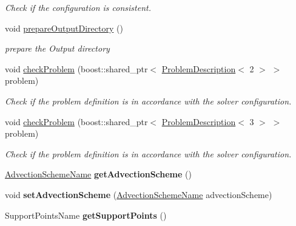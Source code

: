 \begin{DoxyCompactItemize}
\begin{DoxyCompactList}\small\item\em Check if the configuration is consistent. \item\end{DoxyCompactList}\item 
void \hyperlink{classnatrium_1_1SolverConfiguration_a69c009fd87690677b66ab10a000d07f6}{prepareOutputDirectory} ()
\begin{DoxyCompactList}\small\item\em prepare the Output directory \item\end{DoxyCompactList}\item 
void \hyperlink{classnatrium_1_1SolverConfiguration_acc8235baf17f3178be1baf6bd82b35a6}{checkProblem} (boost::shared\_\-ptr$<$ \hyperlink{classnatrium_1_1ProblemDescription}{ProblemDescription}$<$ 2 $>$ $>$ problem)
\begin{DoxyCompactList}\small\item\em Check if the problem definition is in accordance with the solver configuration. \item\end{DoxyCompactList}\item 
void \hyperlink{classnatrium_1_1SolverConfiguration_af841d7ee18a68938be3e207cc8e7f787}{checkProblem} (boost::shared\_\-ptr$<$ \hyperlink{classnatrium_1_1ProblemDescription}{ProblemDescription}$<$ 3 $>$ $>$ problem)
\begin{DoxyCompactList}\small\item\em Check if the problem definition is in accordance with the solver configuration. \item\end{DoxyCompactList}\item 
\hypertarget{classnatrium_1_1SolverConfiguration_aaf32180358f99d78d56b3435dff11a11}{
\hyperlink{namespacenatrium_ab73faf50bccace063cee6f66b5af2b02}{AdvectionSchemeName} {\bfseries getAdvectionScheme} ()}
\label{classnatrium_1_1SolverConfiguration_aaf32180358f99d78d56b3435dff11a11}

\item 
\hypertarget{classnatrium_1_1SolverConfiguration_a4fef165cd5a17247203af08846ec0f31}{
void {\bfseries setAdvectionScheme} (\hyperlink{namespacenatrium_ab73faf50bccace063cee6f66b5af2b02}{AdvectionSchemeName} advectionScheme)}
\label{classnatrium_1_1SolverConfiguration_a4fef165cd5a17247203af08846ec0f31}

\item 
\hypertarget{classnatrium_1_1SolverConfiguration_afddc9530e128375f4876eb3c5cfcbb78}{
SupportPointsName {\bfseries getSupportPoints} ()}
\label{classnatrium_1_1SolverConfiguration_afddc9530e128375f4876eb3c5cfcbb78}


\end{DoxyCompactItemize}
